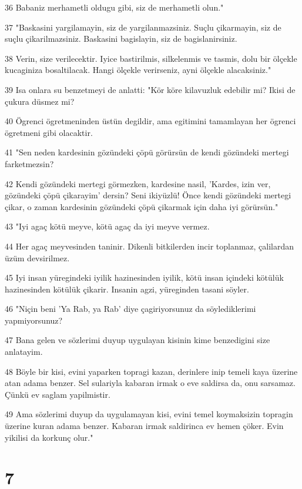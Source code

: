 \par 36 Babaniz merhametli oldugu gibi, siz de merhametli olun."
\par 37 "Baskasini yargilamayin, siz de yargilanmazsiniz. Suçlu çikarmayin, siz de suçlu çikarilmazsiniz. Baskasini bagislayin, siz de bagislanirsiniz.
\par 38 Verin, size verilecektir. Iyice bastirilmis, silkelenmis ve tasmis, dolu bir ölçekle kucaginiza bosaltilacak. Hangi ölçekle verirseniz, ayni ölçekle alacaksiniz."
\par 39 Isa onlara su benzetmeyi de anlatti: "Kör köre kilavuzluk edebilir mi? Ikisi de çukura düsmez mi?
\par 40 Ögrenci ögretmeninden üstün degildir, ama egitimini tamamlayan her ögrenci ögretmeni gibi olacaktir.
\par 41 "Sen neden kardesinin gözündeki çöpü görürsün de kendi gözündeki mertegi farketmezsin?
\par 42 Kendi gözündeki mertegi görmezken, kardesine nasil, 'Kardes, izin ver, gözündeki çöpü çikarayim' dersin? Seni ikiyüzlü! Önce kendi gözündeki mertegi çikar, o zaman kardesinin gözündeki çöpü çikarmak için daha iyi görürsün."
\par 43 "Iyi agaç kötü meyve, kötü agaç da iyi meyve vermez.
\par 44 Her agaç meyvesinden taninir. Dikenli bitkilerden incir toplanmaz, çalilardan üzüm devsirilmez.
\par 45 Iyi insan yüregindeki iyilik hazinesinden iyilik, kötü insan içindeki kötülük hazinesinden kötülük çikarir. Insanin agzi, yüreginden tasani söyler.
\par 46 "Niçin beni 'Ya Rab, ya Rab' diye çagiriyorsunuz da söylediklerimi yapmiyorsunuz?
\par 47 Bana gelen ve sözlerimi duyup uygulayan kisinin kime benzedigini size anlatayim.
\par 48 Böyle bir kisi, evini yaparken topragi kazan, derinlere inip temeli kaya üzerine atan adama benzer. Sel sulariyla kabaran irmak o eve saldirsa da, onu sarsamaz. Çünkü ev saglam yapilmistir.
\par 49 Ama sözlerimi duyup da uygulamayan kisi, evini temel koymaksizin topragin üzerine kuran adama benzer. Kabaran irmak saldirinca ev hemen çöker. Evin yikilisi da korkunç olur."

\chapter{7}

